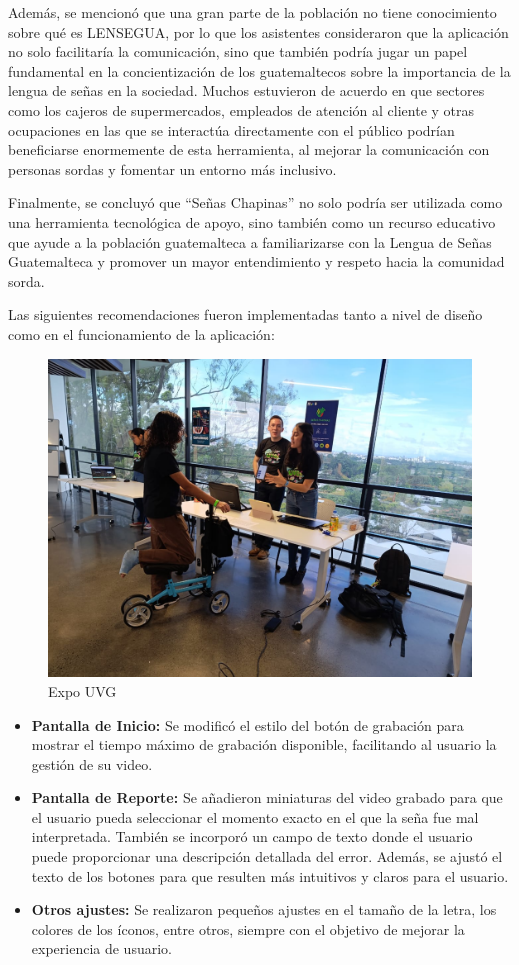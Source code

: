 Además, se mencionó que una gran parte de la población no tiene conocimiento sobre qué es LENSEGUA, por lo que los asistentes consideraron que la aplicación no solo facilitaría la comunicación, sino que también podría jugar un papel fundamental en la concientización de los guatemaltecos sobre la importancia de la lengua de señas en la sociedad. Muchos estuvieron de acuerdo en que sectores como los cajeros de supermercados, empleados de atención al cliente y otras ocupaciones en las que se interactúa directamente con el público podrían beneficiarse enormemente de esta herramienta, al mejorar la comunicación con personas sordas y fomentar un entorno más inclusivo.

Finalmente, se concluyó que ``Señas Chapinas'' no solo podría ser utilizada como una herramienta tecnológica de apoyo, sino también como un recurso educativo que ayude a la población guatemalteca a familiarizarse con la Lengua de Señas Guatemalteca y promover un mayor entendimiento y respeto hacia la comunidad sorda.

Las siguientes recomendaciones fueron implementadas tanto a nivel de diseño como en el funcionamiento de la aplicación:

\begin{figure} [H]
    \centering
    \includegraphics[width=0.5\linewidth]{figuras/expo.jpeg}
    \caption{Expo UVG}
    \label{fig:enter-label}
\end{figure}

\begin{itemize}
    \item \textbf{Pantalla de Inicio:} Se modificó el estilo del botón de grabación para mostrar el tiempo máximo de grabación disponible, facilitando al usuario la gestión de su video.
    
    \item \textbf{Pantalla de Reporte:} Se añadieron miniaturas del video grabado para que el usuario pueda seleccionar el momento exacto en el que la seña fue mal interpretada. También se incorporó un campo de texto donde el usuario puede proporcionar una descripción detallada del error. Además, se ajustó el texto de los botones para que resulten más intuitivos y claros para el usuario.
    
    \item \textbf{Otros ajustes:} Se realizaron pequeños ajustes en el tamaño de la letra, los colores de los íconos, entre otros, siempre con el objetivo de mejorar la experiencia de usuario.
\end{itemize}

